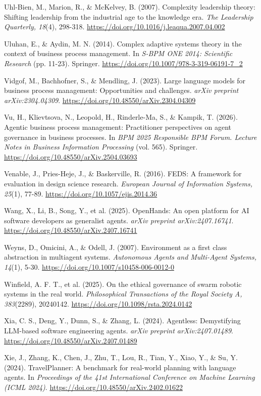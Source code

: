 Uhl-Bien, M., Marion, R., \& McKelvey, B. (2007). Complexity leadership
theory: Shifting leadership from the industrial age to the knowledge
era. \emph{The Leadership Quarterly, 18}(4), 298-318.
\url{https://doi.org/10.1016/j.leaqua.2007.04.002}

Uluhan, E., \& Aydin, M. N. (2014). Complex adaptive systems theory in
the context of business process management. In \emph{S-BPM ONE 2014:
Scientific Research} (pp. 11-23). Springer.
\url{https://doi.org/10.1007/978-3-319-06191-7_2}

Vidgof, M., Bachhofner, S., \& Mendling, J. (2023). Large language
models for business process management: Opportunities and challenges.
\emph{arXiv preprint arXiv:2304.04309}.
\url{https://doi.org/10.48550/arXiv.2304.04309}

Vu, H., Klievtsova, N., Leopold, H., Rinderle-Ma, S., \& Kampik, T.
(2026). Agentic business process management: Practitioner perspectives
on agent governance in business processes. In \emph{BPM 2025 Responsible
BPM Forum. Lecture Notes in Business Information Processing} (vol. 565).
Springer. \url{https://doi.org/10.48550/arXiv.2504.03693}

Venable, J., Pries-Heje, J., \& Baskerville, R. (2016). FEDS: A
framework for evaluation in design science research. \emph{European
Journal of Information Systems, 25}(1), 77-89.
\url{https://doi.org/10.1057/ejis.2014.36}

Wang, X., Li, B., Song, Y., et al. (2025). OpenHands: An open platform
for AI software developers as generalist agents. \emph{arXiv preprint
arXiv:2407.16741}. \url{https://doi.org/10.48550/arXiv.2407.16741}

Weyns, D., Omicini, A., \& Odell, J. (2007). Environment as a first
class abstraction in multiagent systems. \emph{Autonomous Agents and
Multi-Agent Systems, 14}(1), 5-30.
\url{https://doi.org/10.1007/s10458-006-0012-0}

Winfield, A. F. T., et al. (2025). On the ethical governance of swarm
robotic systems in the real world. \emph{Philosophical Transactions of
the Royal Society A, 383}(2289), 20240142.
\url{https://doi.org/10.1098/rsta.2024.0142}

Xia, C. S., Deng, Y., Dunn, S., \& Zhang, L. (2024). Agentless:
Demystifying LLM-based software engineering agents. \emph{arXiv preprint
arXiv:2407.01489}. \url{https://doi.org/10.48550/arXiv.2407.01489}

Xie, J., Zhang, K., Chen, J., Zhu, T., Lou, R., Tian, Y., Xiao, Y.,
\& Su, Y. (2024). TravelPlanner: A benchmark for real-world planning
with language agents. In \emph{Proceedings of the 41st International
Conference on Machine Learning (ICML 2024)}.
\url{https://doi.org/10.48550/arXiv.2402.01622}

